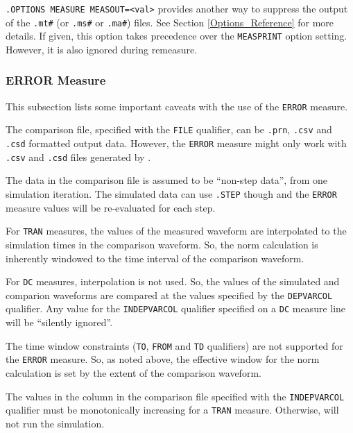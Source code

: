 \texttt{.OPTIONS MEASURE MEASOUT=<val>} provides another way to suppress the output
of the \texttt{.mt\#} (or \texttt{.ms\#} or \texttt{.ma\#}) files.
See Section \ref{Options_Reference} for more details.  If given, this
option takes precedence over the \texttt{MEASPRINT} option setting.
However, it is also ignored during remeasure.

\subsubsection{ERROR Measure}
\label{Measure_Error_Measure}
This subsection lists some important caveats with the use of the \texttt{ERROR}
measure.
\begin{XyceItemize}

  \item The comparison file, specified with the {\tt FILE} qualifier,
    can be {\tt .prn}, {\tt .csv} and {\tt .csd} formatted output
    data.  However, the {\tt ERROR} measure might only work with {\tt
    .csv} and {\tt .csd} files generated by \Xyce{}.  \item The data
    in the comparison file is assumed to be ``non-step data'', from
    one simulation iteration.  The simulated data can use {\tt .STEP}
    though and the {\tt ERROR} measure values will be re-evaluated for
    each step.  \item For {\tt TRAN} measures, the values of the
    measured waveform are interpolated to the simulation times in the
    comparison waveform.  So, the norm calculation is inherently
    windowed to the time interval of the comparison waveform.  \item
    For {\tt DC} measures, interpolation is not used.  So, the values
    of the simulated and comparion waveforms are compared at the
    values specified by the {\tt DEPVARCOL} qualifier.  Any value for
    the {\tt INDEPVARCOL} qualifier specified on a {\tt DC} measure
    line will be ``silently ignored''.

  \item The time window constraints ({\tt TO}, {\tt FROM} and {\tt TD}
    qualifiers) are not supported for the {\tt ERROR} measure.  So, as
    noted above, the effective window for the norm calculation is set
    by the extent of the comparison waveform.

  \item The values in the column in the comparison file specified with
    the {\tt INDEPVARCOL} qualifier must be monotonically increasing
    for a {\tt TRAN} measure.  Otherwise, \Xyce{} will not run the
    simulation.


\end{XyceItemize}
